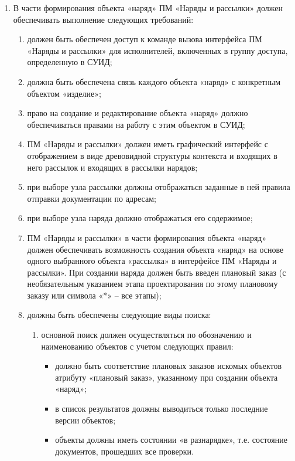 \documentclass[oneside, final, 12pt]{article}
\renewcommand{\labelenumi}{\arabic{section}.\arabic{subsection}.\arabic{enumi}}
\begin{document}
\begin{enumerate}
\renewcommand{\labelenumi}{\arabic{section}.\arabic{subsection}.\arabic{subsubsection}.\arabic{enumi}}
    \item В части формирования объекта «наряд» ПМ «Наряды и рассылки» должен обеспечивать выполнение следующих требований:
    \begin{enumerate}
        \item должен быть обеспечен доступ к команде вызова интерфейса ПМ «Наряды и рассылки» для исполнителей, включенных в группу доступа, определенную в СУИД;
        \item должна быть обеспечена связь каждого объекта «наряд» с конкретным объектом «изделие»;
        \item право на создание и редактирование объекта «наряд» должно обеспечиваться правами на работу с этим объектом в СУИД;
        \item ПМ «Наряды и рассылки» должен иметь графический интерфейс с отображением в виде древовидной структуры контекста и входящих в него рассылок и входящих в рассылки нарядов;
        \item при выборе узла рассылки должны отображаться заданные в ней правила отправки документации по адресам;
        \item при выборе узла наряда должно отображаться его содержимое;
        \item ПМ «Наряды и рассылки» в части формирования объекта «наряд» должен обеспечивать возможность создания объекта «наряд» на основе одного выбранного объекта «рассылка» в интерфейсе ПМ «Наряды и рассылки». При создании наряда должен быть введен плановый заказ (с необязательным указанием этапа проектирования по этому плановому заказу или символа «*» – все этапы);
        \item должны быть обеспечены следующие виды поиска:
        \begin{enumerate}
            \item основной поиск должен осуществляться по обозначению и наименованию объектов с учетом следующих правил:
            \begin{itemize}
                \item должно быть соответствие плановых заказов искомых объектов атрибуту «плановый заказ», указанному при создании объекта «наряд»;
                \item в список результатов должны выводиться только последние версии объектов;
                \item объекты должны иметь состоянии «в разнарядке», т.е. состояние документов, прошедших все проверки.

\end{itemize}
\end{enumerate}
\end{enumerate}
\end{enumerate}
\end{document}
